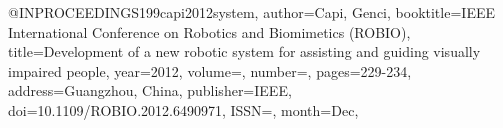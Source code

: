 @INPROCEEDINGS{199capi2012system,
author={Capi, Genci},
booktitle={IEEE International Conference on Robotics and Biomimetics (ROBIO)}, 
title={Development of a new robotic system for assisting and guiding visually impaired people}, 
year={2012},
volume={},
number={},
pages={229-234},
address={Guangzhou, China},
publisher={IEEE},
doi={10.1109/ROBIO.2012.6490971},
ISSN={},
month={Dec},}